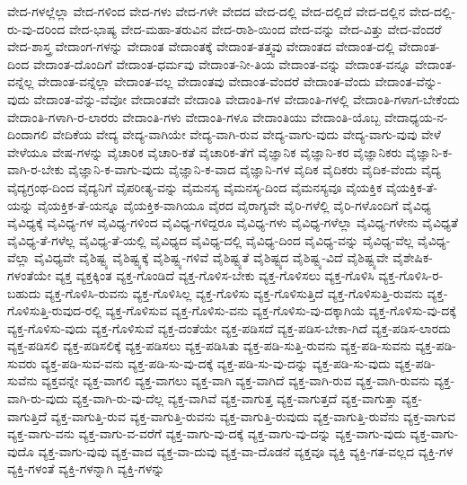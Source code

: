 {ವೇದ-ಗಳಲ್ಲೆಲ್ಲಾ
ವೇದ-ಗಳಿಂದ
ವೇದ-ಗಳು
ವೇದ-ಗಳೇ
ವೇದದ
ವೇದ-ದಲ್ಲಿ
ವೇದ-ದಲ್ಲಿದೆ
ವೇದ-ದಲ್ಲಿನ
ವೇದ-ದಲ್ಲಿ-ರು-ವು-ದರಿಂದ
ವೇದ-ಭಾಷ್ಯ
ವೇದ-ಮಹಾ-ತರುವಿನ
ವೇದ-ರಾಶಿ-ಯಿಂದ
ವೇದ-ವನ್ನು
ವೇದ-ವಿತ್ತು
ವೇದ-ವೆಂದರೆ
ವೇದ-ಶಾಸ್ತ್ರ
ವೇದಾಂಗ-ಗಳನ್ನು
ವೇದಾಂತ
ವೇದಾಂತಕ್ಕೆ
ವೇದಾಂತ-ತತ್ತ್ವವು
ವೇದಾಂತದ
ವೇದಾಂತ-ದಲ್ಲಿ
ವೇದಾಂತ-ದಿಂದ
ವೇದಾಂತ-ದೊಂದಿಗೆ
ವೇದಾಂತ-ಧರ್ಮವು
ವೇದಾಂತ-ನೀ-ತಿಯ
ವೇದಾಂತ-ವನ್ನು
ವೇದಾಂತ-ವನ್ನೂ
ವೇದಾಂತ-ವನ್ನೆಲ್ಲ
ವೇದಾಂತ-ವನ್ನೆಲ್ಲಾ
ವೇದಾಂತ-ವಲ್ಲ
ವೇದಾಂತವು
ವೇದಾಂತ-ವೆಂದರೆ
ವೇದಾಂತ-ವೆಂದು
ವೇದಾಂತ-ವೆನ್ನು-ವುದು
ವೇದಾಂತ-ವೆನ್ನು-ವೆವೋ
ವೇದಾಂತವೇ
ವೇದಾಂತಿ
ವೇದಾಂತಿ-ಗಳ
ವೇದಾಂತಿ-ಗಳಲ್ಲಿ
ವೇದಾಂತಿ-ಗಳಾಗ-ಬೇಕೆಂದು
ವೇದಾಂತಿ-ಗಳಾಗಿ-ರ-ಲಾರರು
ವೇದಾಂತಿ-ಗಳು
ವೇದಾಂತಿ-ಗಳೂ
ವೇದಾಂತಿಯು
ವೇದಾಂತಿ-ಯೊಬ್ಬ
ವೇದಾಧ್ಯಯ-ನ-ದಿಂದಾಗಲಿ
ವೇದಿಕೆಯ
ವೇದ್ಯ
ವೇದ್ಯ-ವಾಗಿಯೇ
ವೇದ್ಯ-ವಾಗಿ-ರುವ
ವೇದ್ಯ-ವಾಗು-ವುದು
ವೇದ್ಯ-ವಾಗು-ವುವು
ವೇಳೆ
ವೇಳೆಯೂ
ವೇಷ-ಗಳನ್ನು
ವೈಚಾರಿಕ
ವೈಚಾರಿ-ಕತೆ
ವೈಚಾರಿಕ-ತೆಗೆ
ವೈಜ್ಞಾನಿಕ
ವೈಜ್ಞಾನಿ-ಕರ
ವೈಜ್ಞಾನಿಕರು
ವೈಜ್ಞಾನಿ-ಕ-ವಾಗಿ-ರ-ಬೇಕು
ವೈಜ್ಞಾನಿ-ಕ-ವಾಗು-ವುದು
ವೈಜ್ಞಾನಿ-ಕ-ವಾದ
ವೈಜ್ಞಾನಿ-ಗಳ
ವೈದಿಕ
ವೈದಿಕರು
ವೈದಿಕ-ವೆಂದು
ವೈದ್ಯ
ವೈದ್ಯಗ್ರಂಥ-ದಿಂದ
ವೈದ್ಯನಿಗೆ
ವೈಪರೀತ್ಯ-ವನ್ನು
ವೈಮನಸ್ಯ
ವೈಮನಸ್ಯ-ದಿಂದ
ವೈಮನಸ್ಯವೂ
ವೈಯಕ್ತಿಕ
ವೈಯಕ್ತಿಕ-ತೆ-ಯನ್ನು
ವೈಯಕ್ತಿಕ-ತೆ-ಯನ್ನೂ
ವೈಯಕ್ತಿಕ-ವಾಗಿಯೂ
ವೈರದ
ವೈರಾಗ್ಯವೇ
ವೈರಿ-ಗಳೆಲ್ಲಿ
ವೈರಿ-ಗಳೊಂದಿಗೆ
ವೈವಿಧ್ಯ
ವೈವಿಧ್ಯಕ್ಕೆ
ವೈವಿಧ್ಯ-ಗಳ
ವೈವಿಧ್ಯ-ಗಳಿಂದ
ವೈವಿಧ್ಯ-ಗಳಿದ್ದರೂ
ವೈವಿಧ್ಯ-ಗಳು
ವೈವಿಧ್ಯ-ಗಳೆಲ್ಲಾ
ವೈವಿಧ್ಯ-ಗಳೇನು
ವೈವಿಧ್ಯತೆ
ವೈವಿಧ್ಯ-ತೆ-ಗಳೆಲ್ಲ
ವೈವಿಧ್ಯ-ತೆ-ಯಲ್ಲಿ
ವೈವಿಧ್ಯದ
ವೈವಿಧ್ಯ-ದಲ್ಲಿ
ವೈವಿಧ್ಯ-ದಿಂದ
ವೈವಿಧ್ಯ-ವನ್ನು
ವೈವಿಧ್ಯ-ವೆಲ್ಲ
ವೈವಿಧ್ಯ-ವೆಲ್ಲಾ
ವೈವಿಧ್ಯವೇ
ವೈಶಿಷ್ಟ್ಯ
ವೈಶಿಷ್ಟ್ಯಕ್ಕೆ
ವೈಶಿಷ್ಟ್ಯ-ಗಳಿವೆ
ವೈಶಿಷ್ಟ್ಯತೆ
ವೈಶಿಷ್ಟ್ಯದ
ವೈಶಿಷ್ಟ್ಯ-ವಿದೆ
ವೈಶಿಷ್ಟ್ಯವೇ
ವೈಶೇಷಿಕ-ಗಳಂತೆಯೇ
ವ್ಯಕ್ತ
ವ್ಯಕ್ತಕ್ಕಿಂತ
ವ್ಯಕ್ತ-ಗೊಂಡಿದೆ
ವ್ಯಕ್ತ-ಗೊಳಿಸ-ಬೇಕು
ವ್ಯಕ್ತ-ಗೊಳಿಸಲು
ವ್ಯಕ್ತ-ಗೊಳಿಸಿ
ವ್ಯಕ್ತ-ಗೊಳಿಸಿ-ರ-ಬಹುದು
ವ್ಯಕ್ತ-ಗೊಳಿಸಿ-ರುವನು
ವ್ಯಕ್ತ-ಗೊಳಿಸಿಲ್ಲ
ವ್ಯಕ್ತ-ಗೊಳಿಸು
ವ್ಯಕ್ತ-ಗೊಳಿಸುತ್ತಿದೆ
ವ್ಯಕ್ತ-ಗೊಳಿಸುತ್ತಿ-ರುವನು
ವ್ಯಕ್ತ-ಗೊಳಿಸುತ್ತಿ-ರುವುದ-ರಲ್ಲಿ
ವ್ಯಕ್ತ-ಗೊಳಿಸುವ
ವ್ಯಕ್ತ-ಗೊಳಿಸು-ವನು
ವ್ಯಕ್ತ-ಗೊಳಿಸು-ವು-ದಕ್ಕಾಗಿಯೆ
ವ್ಯಕ್ತ-ಗೊಳಿಸು-ವು-ದಕ್ಕೆ
ವ್ಯಕ್ತ-ಗೊಳಿಸು-ವುದು
ವ್ಯಕ್ತ-ಗೊಳಿಸುವೆ
ವ್ಯಕ್ತ-ದಂತೆಯೇ
ವ್ಯಕ್ತ-ಪಡಿಸದೆ
ವ್ಯಕ್ತ-ಪಡಿಸ-ಬೇಕಾ-ಗಿದೆ
ವ್ಯಕ್ತ-ಪಡಿಸ-ಲಾರದು
ವ್ಯಕ್ತ-ಪಡಿಸಲಿ
ವ್ಯಕ್ತ-ಪಡಿಸಲಿಕ್ಕೆ
ವ್ಯಕ್ತ-ಪಡಿಸಲು
ವ್ಯಕ್ತ-ಪಡಿಸಿತು
ವ್ಯಕ್ತ-ಪಡಿ-ಸುತ್ತಿ-ರುವನು
ವ್ಯಕ್ತ-ಪಡಿ-ಸುವನು
ವ್ಯಕ್ತ-ಪಡಿ-ಸುವರು
ವ್ಯಕ್ತ-ಪಡಿ-ಸುವ-ವನು
ವ್ಯಕ್ತ-ಪಡಿ-ಸು-ವು-ದಕ್ಕೆ
ವ್ಯಕ್ತ-ಪಡಿ-ಸು-ವು-ದನ್ನು
ವ್ಯಕ್ತ-ಪಡಿ-ಸು-ವುದು
ವ್ಯಕ್ತ-ಪಡಿ-ಸುವೆನು
ವ್ಯಕ್ತವನ್ನೇ
ವ್ಯಕ್ತ-ವಾಗಲಿ
ವ್ಯಕ್ತ-ವಾಗಲು
ವ್ಯಕ್ತ-ವಾಗಿ
ವ್ಯಕ್ತ-ವಾಗಿದೆ
ವ್ಯಕ್ತ-ವಾಗಿ-ರುವ
ವ್ಯಕ್ತ-ವಾಗಿ-ರುವನು
ವ್ಯಕ್ತ-ವಾಗಿ-ರು-ವುದು
ವ್ಯಕ್ತ-ವಾಗಿ-ರು-ವು-ದೆಲ್ಲ
ವ್ಯಕ್ತ-ವಾಗಿವೆ
ವ್ಯಕ್ತ-ವಾಗುತ್ತ
ವ್ಯಕ್ತ-ವಾಗುತ್ತದೆ
ವ್ಯಕ್ತ-ವಾಗುತ್ತಾ
ವ್ಯಕ್ತ-ವಾಗುತ್ತಿದೆ
ವ್ಯಕ್ತ-ವಾಗುತ್ತಿ-ರುವ
ವ್ಯಕ್ತ-ವಾಗುತ್ತಿ-ರುವನು
ವ್ಯಕ್ತ-ವಾಗುತ್ತಿ-ರುವುದು
ವ್ಯಕ್ತ-ವಾಗುತ್ತಿ-ರುವೆನು
ವ್ಯಕ್ತ-ವಾಗುವ
ವ್ಯಕ್ತ-ವಾಗು-ವನು
ವ್ಯಕ್ತ-ವಾಗು-ವ-ವರೆಗೆ
ವ್ಯಕ್ತ-ವಾಗು-ವು-ದಕ್ಕೆ
ವ್ಯಕ್ತ-ವಾಗು-ವು-ದನ್ನು
ವ್ಯಕ್ತ-ವಾಗು-ವುದು
ವ್ಯಕ್ತ-ವಾಗು-ವುದೊ
ವ್ಯಕ್ತ-ವಾಗು-ವುವು
ವ್ಯಕ್ತ-ವಾದ
ವ್ಯಕ್ತ-ವಾ-ದುವು
ವ್ಯಕ್ತ-ವಾ-ದೊಡನೆ
ವ್ಯಕ್ತವೂ
ವ್ಯಕ್ತಿ
ವ್ಯಕ್ತಿ-ಗತ-ವಲ್ಲದ
ವ್ಯಕ್ತಿ-ಗಳ
ವ್ಯಕ್ತಿ-ಗಳಂತೆ
ವ್ಯಕ್ತಿ-ಗಳನ್ನಾಗಿ
ವ್ಯಕ್ತಿ-ಗಳನ್ನು
}
